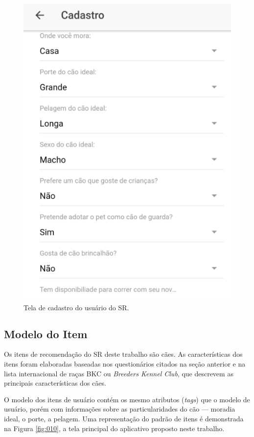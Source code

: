 \documentclass[portuguese]{textolivre}
\begin{document}
\begin{figure}
	\centering
	\includegraphics[scale=0.80]{imagens/fig-014.png}
	\caption{Tela de cadastro do usuário do SR.}
	\label{fig:014}
\end{figure}

\subsection {Modelo do Item}

Os itens de recomendação do SR deste trabalho são cães. As características dos itens foram elaboradas baseadas nos questionários citados na seção anterior e na lista internacional de raças BKC ou \textit{Breeders Kennel Club}, que descrevem as principais características dos cães.

O modelo dos itens de usuário contém os mesmo atributos (\textit{tags}) que o modelo de usuário, porém com informações sobre as particularidades do cão — moradia ideal, o porte, a pelagem. Uma representação do padrão de itens é demonstrada na Figura \ref{fig:010}, a tela principal do aplicativo proposto neste trabalho.
\end{document}
